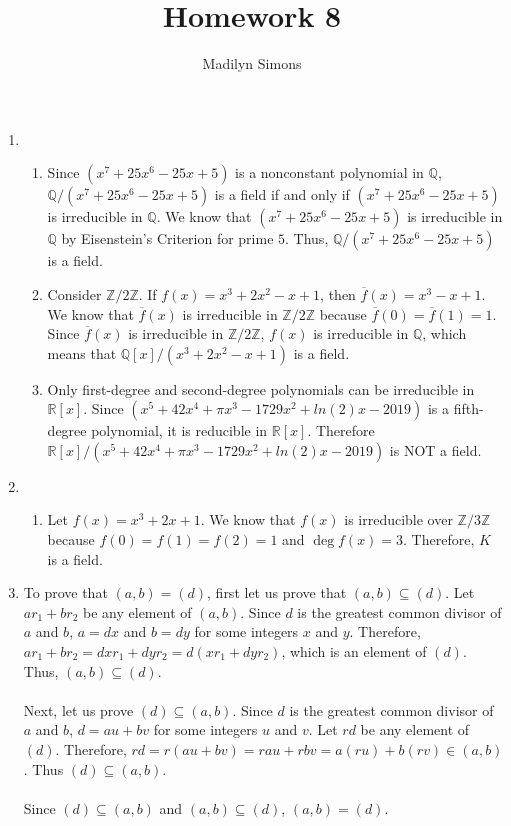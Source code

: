 \documentclass{article}
\title{Homework 8}
\author{Madilyn Simons}
\date{}
\begin{document}
\maketitle

\begin{enumerate}

\item
\begin{enumerate}

\item Since $(x^7 + 25x^6 - 25x + 5)$ is a nonconstant polynomial in
$\mathbb{Q}$, $\mathbb{Q}/(x^7 + 25x^6 - 25x + 5)$ is a field if and only if
$(x^7 + 25x^6 - 25x + 5)$ is irreducible in $\mathbb{Q}$.  We know that
$(x^7 + 25x^6 - 25x + 5)$ is irreducible in $\mathbb{Q}$ by Eisenstein's
Criterion for prime $5$.  Thus, $\mathbb{Q}/(x^7 + 25x^6 - 25x + 5)$ is a field.

\item Consider $\mathbb{Z}/2\mathbb{Z}$.  If $f(x) = x^3 + 2x^2 - x + 1$, then
$\overline{f}(x) = x^3 - x + 1$.  We know that $\overline{f}(x)$ is
irreducible in $\mathbb{Z}/2\mathbb{Z}$ because
$\overline{f}(0) = \overline{f}(1) = 1$.  Since $\overline{f}(x)$ is
irreducible in $\mathbb{Z}/2\mathbb{Z}$, $f(x)$ is irreducible in $\mathbb{Q}$,
which means that $\mathbb{Q}[x]/(x^3 + 2x^2 - x + 1)$ is a field.

\item Only first-degree and second-degree polynomials can be irreducible in
$\mathbb{R}[x]$.  Since $(x^5 + 42x^4 + \pi x^3 -1729x^2 + ln(2)x - 2019)$
is a fifth-degree polynomial, it is reducible in $\mathbb{R}[x]$.  Therefore
$\mathbb{R}[x]/(x^5 + 42x^4 + \pi x^3 -1729x^2 + ln(2)x - 2019)$ is NOT
a field.

\end{enumerate}

\item
\begin{enumerate}
\item
Let $f(x) = x^3 + 2x + 1$.  We know that $f(x)$ is irreducible over
$\mathbb{Z}/3\mathbb{Z}$ because $f(0) = f(1) = f(2) = 1$ and $\deg f(x) = 3$.
Therefore,
$K$ is a field.

\end{enumerate}

\item To prove that $(a,b) = (d)$, first let us prove that $(a,b) \subseteq (d)$.
Let $ar_1 + br_2$ be any element of $(a,b)$.  Since $d$ is the greatest common
divisor of $a$ and $b$, $a = dx$ and $b = dy$ for some integers $x$ and $y$.
Therefore, $ar_1 + br_2 = dxr_1 + dyr_2 = d(xr_{1} + dyr_{2})$, which is an
element of $(d)$.  Thus, $(a,b) \subseteq (d)$. \\ \\
Next, let us prove $(d) \subseteq (a,b)$.  Since $d$ is the greatest common
divisor of $a$ and $b$, $d = au + bv$ for some integers $u$ and $v$.  Let
$rd$ be any element of $(d)$.
Therefore, $rd = r(au + bv) = rau + rbv = a(ru) + b(rv) \in (a,b)$.
Thus $(d) \subseteq (a,b)$. \\ \\
Since $(d) \subseteq (a,b)$ and $(a,b) \subseteq (d)$, $(a,b) = (d)$.


\end{enumerate}
\end{document}
